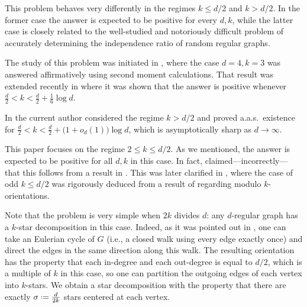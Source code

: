 \documentclass[12pt]{amsart}
\theoremstyle{definition}
\newcommand{\defeq}{\mathrel{\vcenter{\baselineskip0.5ex \lineskiplimit0pt
                     \hbox{\scriptsize.}\hbox{\scriptsize.}}}%
                     =}
\begin{document}
This problem behaves very differently in the regimes $k \leq d/2$ and $k>d/2$. In the former case the answer is expected to be positive for every $d,k$, while the latter case is closely related to the well-studied and notoriously difficult problem of accurately determining the independence ratio of random regular graphs.

The study of this problem was initiated in \cite{delcourt2018random}, where the case $d=4, k=3$ was answered affirmatively using second moment calculations. That result was extended recently in \cite{delcourt2023decomposing} where it was shown that the answer is positive whenever $\frac{d}{2}<k<\frac{d}{2}+\frac16\log d$.

In \cite{harangi2025star1} the current author considered the regime $k>d/2$ and proved a.a.s.~existence for $\frac{d}{2}<k<\frac{d}{2}+\big( 1+o_d(1) \big)\log d$, which is asymptotically sharp as $d \to \infty$.

This paper focuses on the regime $2 \leq k \leq d/2$. As we mentioned, the answer is expected to be positive for all $d,k$ in this case. In fact, \cite[Theorem 1.1]{delcourt2018random} claimed---incorrectly---that this follows from a result in \cite{lovaszml2013mod_orientation}. This was later clarified in \cite{delcourt2023decomposing}, where the case of odd $k \leq d/2$ was rigorously deduced from a result of \cite{lovaszml2013mod_orientation} regarding modulo $k$-orientations. 

Note that the problem is very simple when $2k$ divides $d$: any $d$-regular graph has a $k$-star decomposition in this case. Indeed, as it was pointed out in \cite{delcourt2023decomposing}, one can take an Eulerian cycle of $G$ (i.e., a closed walk using every edge exactly once) and direct the edges in the same direction along this walk. The resulting orientation has the property that each in-degree and each out-degree is equal to $d/2$, which is a multiple of $k$ in this case, so one can partition the outgoing edges of each vertex into $k$-stars. We obtain a star decomposition with the property that there are exactly $\sigma \defeq \frac{d}{2k}$ stars centered at each vertex.
\end{document}
